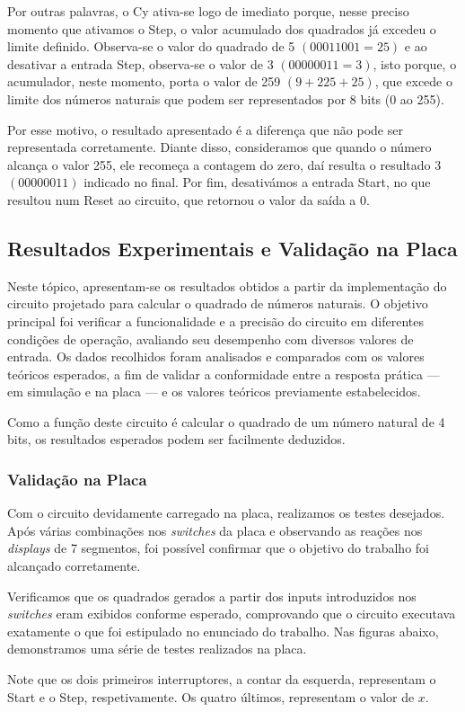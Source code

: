 Por outras palavras, o Cy ativa-se logo de imediato porque, nesse preciso momento que ativamos o Step, o valor acumulado dos quadrados já excedeu o limite definido. Observa-se o valor do quadrado de 5 $(00011001 = 25)$ e ao desativar a entrada Step, observa-se o valor de 3 $(00000011 = 3)$, isto porque, o acumulador, neste momento, porta o valor de 259 $(9 + 225 + 25)$, que excede o limite dos números naturais que podem ser representados por 8 bits (0 ao 255).

Por esse motivo, o resultado apresentado é a diferença que não pode ser representada corretamente. Diante disso, consideramos que quando o número alcança o valor 255, ele recomeça a contagem do zero, daí resulta o resultado 3 $(00000011)$ indicado no final.
Por fim, desativámos a entrada Start, no que resultou num Reset ao circuito, que retornou o valor da saída a 0.

\subsection{Resultados Experimentais e Validação na Placa}

Neste tópico, apresentam-se os resultados obtidos a partir da implementação do circuito projetado para calcular o quadrado de números naturais. O objetivo principal foi verificar a funcionalidade e a precisão do circuito em diferentes condições de operação, avaliando seu desempenho com diversos valores de entrada. Os dados recolhidos foram analisados e comparados com os valores teóricos esperados, a fim de validar a conformidade entre a resposta prática — em simulação e na placa — e os valores teóricos previamente estabelecidos.

Como a função deste circuito é calcular o quadrado de um número natural de 4 bits, os resultados esperados podem ser facilmente deduzidos.

\subsubsection{Validação na Placa}

Com o circuito devidamente carregado na placa, realizamos os testes desejados. Após várias combinações nos \textit{switches} da placa e observando as reações nos \textit{displays} de 7 segmentos, foi possível confirmar que o objetivo do trabalho foi alcançado corretamente.

Verificamos que os quadrados gerados a partir dos inputs introduzidos nos \textit{switches} eram exibidos conforme esperado, comprovando que o circuito executava exatamente o que foi estipulado no enunciado do trabalho. Nas figuras abaixo, demonstramos uma série de testes realizados na placa.
\vspace*{\fill}
\begin{infoclean}
    Note que os dois primeiros interruptores, a contar da esquerda, representam o Start e o Step, respetivamente. Os quatro últimos, representam o valor de $x$.
\end{infoclean}


